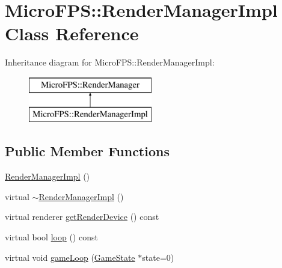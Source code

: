 \hypertarget{class_micro_f_p_s_1_1_render_manager_impl}{
\section{MicroFPS::RenderManagerImpl Class Reference}
\label{de/d41/class_micro_f_p_s_1_1_render_manager_impl}
}
Inheritance diagram for MicroFPS::RenderManagerImpl:\begin{figure}[H]
\begin{center}
\leavevmode
\includegraphics[height=2.000000cm]{de/d41/class_micro_f_p_s_1_1_render_manager_impl}
\end{center}
\end{figure}
\subsection*{Public Member Functions}
\begin{DoxyCompactItemize}
\item 
\hyperlink{class_micro_f_p_s_1_1_render_manager_impl_a3fe0b36c083e52153d4118c7e68ec842}{RenderManagerImpl} ()
\item 
virtual \hyperlink{class_micro_f_p_s_1_1_render_manager_impl_a4e64d05f033e969f4d73369ff85ffabe}{$\sim$RenderManagerImpl} ()
\item 
virtual renderer \hyperlink{class_micro_f_p_s_1_1_render_manager_impl_ae20d62f6586e0b9fd2513d7b880f65fc}{getRenderDevice} () const 
\item 
virtual bool \hyperlink{class_micro_f_p_s_1_1_render_manager_impl_afa5e1bcacb69beb73f00701db08769d2}{loop} () const 
\item 
virtual void \hyperlink{class_micro_f_p_s_1_1_render_manager_impl_a5967f1a8917ea93a5e9a1fd4ec2beedc}{gameLoop} (\hyperlink{class_micro_f_p_s_1_1_game_state}{GameState} $\ast$state=0)
\end{DoxyCompactItemize}


